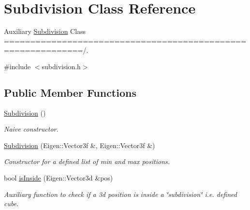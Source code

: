 \hypertarget{class_subdivision}{}\section{Subdivision Class Reference}
\label{class_subdivision}


Auxiliary \hyperlink{class_subdivision}{Subdivision} Class =============================================================/.  




{\ttfamily \#include $<$subdivision.\+h$>$}

\subsection*{Public Member Functions}
\begin{DoxyCompactItemize}
\item 
\mbox{\label{class_subdivision_ac51db3c00b0e4f7543c34859ad846871}} 
\hyperlink{class_subdivision_ac51db3c00b0e4f7543c34859ad846871}{Subdivision} ()
\begin{DoxyCompactList}\small\item\em Naive constructor. \end{DoxyCompactList}\item 
\mbox{\label{class_subdivision_a96a55a5e9c88a2ee0640a904bb30141c}} 
\hyperlink{class_subdivision_a96a55a5e9c88a2ee0640a904bb30141c}{Subdivision} (Eigen\+::\+Vector3f \&, Eigen\+::\+Vector3f \&)
\begin{DoxyCompactList}\small\item\em Constructor for a defined list of min and max positions. \end{DoxyCompactList}\item 
bool \hyperlink{class_subdivision_adb91e1cc1e6959d13220454ddfc7ba28}{is\+Inside} (Eigen\+::\+Vector3d \&pos)
\begin{DoxyCompactList}\small\item\em Auxiliary function to check if a 3d position is inside a \char`\"{}subdivision\char`\"{} i.\+e. defined cube. \end{DoxyCompactList}\end{DoxyCompactItemize}

